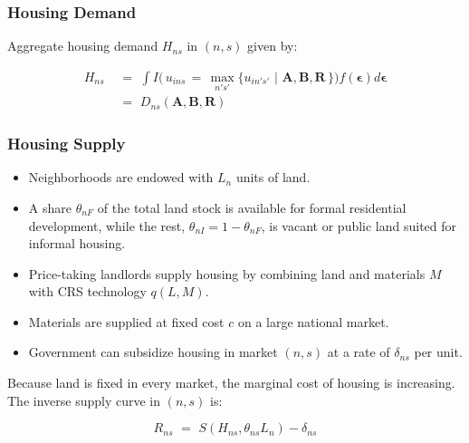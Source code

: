 \documentclass[aspectratio=149]{beamer}
\begin{document}

\begin{frame}
\frametitle{Housing Demand}

Aggregate housing demand $H_{ns}$ in $(n,s)$ given by:

\begin{equation*}
\begin{aligned}
H_{ns} \,\,& =\,\, \int I\Big( \, u_{ins} \,=\, \max_{n's'}\{u_{in' s'} \,\,|\,\, \bm{A},\bm{B},\bm{R}\,\} \Big)f(\bm{\epsilon}) d\bm{\epsilon}    \\[.2em]
        \,\,& =\,\, D_{ns}(\bm{A},\bm{B},\bm{R})
\end{aligned}
\end{equation*}

\end{frame}


\begin{frame}
\frametitle{Housing Supply}

\begin{itemize}
  \item Neighborhoods are endowed with $L_n$ units of land.
  \item A share $\theta_{nF}$ of the total land stock is available for formal residential development, while the rest, $\theta_{nI} = 1-\theta_{nF}$, is vacant or public land suited for informal housing.
  \item Price-taking landlords supply housing by combining land and materials $M$ with CRS technology $q(L,M)$.
  \item Materials are supplied at fixed cost $c$ on a large national market.
  \item Government can subsidize housing in market $(n,s)$ at a rate of $\delta_{ns}$ per unit.
\end{itemize}

Because land is fixed in every market, the marginal cost of housing is increasing. The inverse supply curve in $(n,s)$ is:

\begin{equation*}
R_{ns} \,\, =\,\, S(H_{ns},\theta_{ns}L_n) - \delta_{ns}
\end{equation*} 

\vspace{4mm}

\end{frame}

\end{document}
